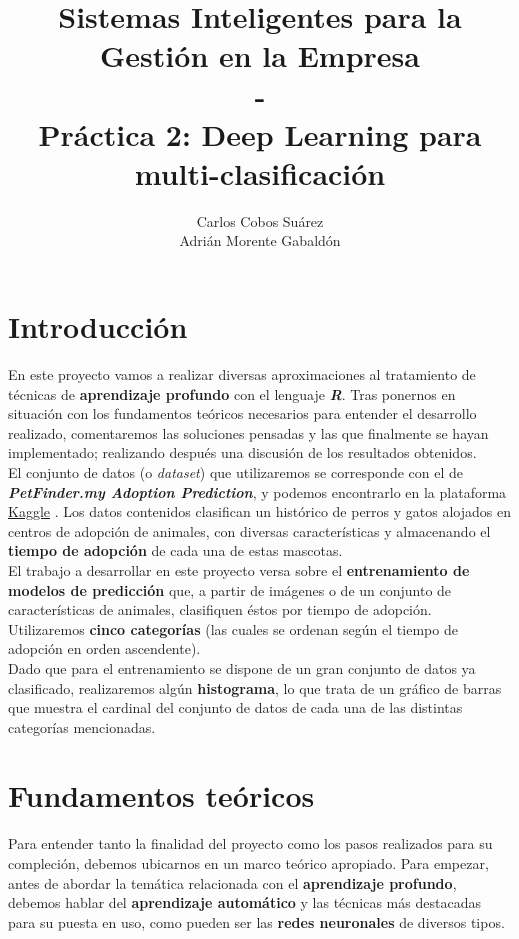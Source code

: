 \documentclass[]{scrartcl}
\title{Sistemas Inteligentes para la Gestión en la Empresa\\-\\Práctica 2: Deep Learning para multi-clasificación}
\author{Carlos Cobos Suárez\\Adrián Morente Gabaldón}
\begin{document}
\maketitle
\newpage
\tableofcontents
\newpage

\section{Introducción}

En este proyecto vamos a realizar diversas aproximaciones al tratamiento de técnicas de \textbf{aprendizaje profundo} con el lenguaje \textbf{\textit{R}}. Tras ponernos en situación con los fundamentos teóricos necesarios para entender el desarrollo realizado, comentaremos las soluciones pensadas y las que finalmente se hayan implementado; realizando después una discusión de los resultados obtenidos.\\

El conjunto de datos (o \textit{dataset}) que utilizaremos se corresponde con el de \textbf{\textit{PetFinder.my Adoption Prediction}}, y podemos encontrarlo en la plataforma \href{https://kaggle.com}{Kaggle} \cite{petfinder-dataset}. Los datos contenidos clasifican un histórico de perros y gatos alojados en centros de adopción de animales, con diversas características y almacenando el \textbf{tiempo de adopción} de cada una de estas mascotas.\\

El trabajo a desarrollar en este proyecto versa sobre el \textbf{entrenamiento de modelos de predicción} que, a partir de imágenes o de un conjunto de características de animales, clasifiquen éstos por tiempo de adopción. Utilizaremos \textbf{cinco categorías} (las cuales se ordenan según el tiempo de adopción en orden ascendente).\\

Dado que para el entrenamiento se dispone de un gran conjunto de datos ya clasificado, realizaremos algún \textbf{histograma}, lo que trata de un gráfico de barras que muestra el cardinal del conjunto de datos de cada una de las distintas categorías mencionadas.

\section{Fundamentos teóricos}

	Para entender tanto la finalidad del proyecto como los pasos realizados para su compleción, debemos ubicarnos en un marco teórico apropiado. Para empezar, antes de abordar la temática relacionada con el \textbf{aprendizaje profundo}, debemos hablar del \textbf{aprendizaje automático} y las técnicas más destacadas para su puesta en uso, como pueden ser las \textbf{redes neuronales} de diversos tipos.
	
\end{document}
